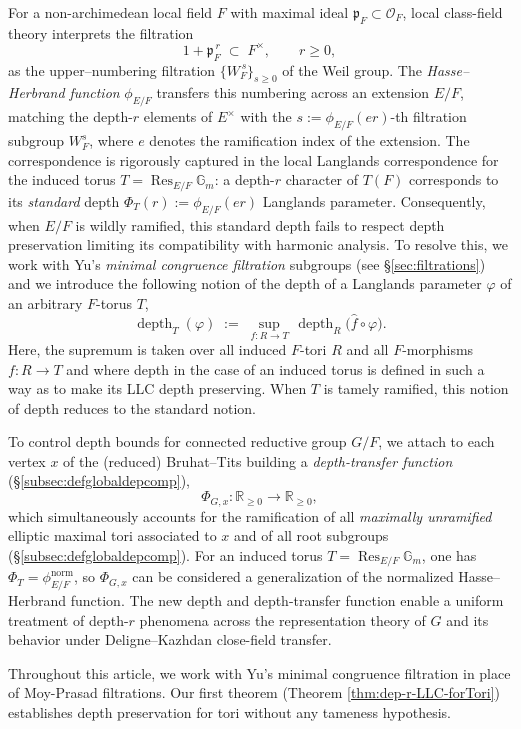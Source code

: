 \documentclass[american]{article}
\numberwithin{equation}{section}
\numberwithin{figure}{section}
\theoremstyle{plain}
\theoremstyle{definition}
\theoremstyle{remark}
\DeclareMathOperator{\depth}{depth}
\DeclareMathOperator{\Res}{Res}
\begin{document}
For a non-archimedean local field $F$  with maximal ideal \(\mathfrak p_F\subset\mathcal O_F\), local class-field theory interprets the filtration
\[
1 + \mathfrak p_F^{\,r}\;\subset\;F^{\times},\qquad r\ge 0,
\]
as the upper--numbering filtration $\{W_F^{\,s}\}_{s\ge 0}$ of the Weil group. The \emph{Hasse--Herbrand function} \(\phi_{E/F}\) transfers this numbering across an extension $E/F$, matching the depth-$r$ elements of $E^{\times}$ with the \(s:=\phi_{E/F}(er)\)-th filtration subgroup \(W_F^s\), where $e$ denotes the ramification index of the extension. The correspondence is rigorously captured in the local Langlands correspondence for the induced torus \(T=\Res_{E/F}\mathbb{G}_m\): a depth-\(r\) character of \(T(F)\) corresponds to its \emph{standard} depth \(\Phi_T(r):=\phi_{E/F}(er)\) Langlands parameter. Consequently, when $E/F$ is wildly ramified, this standard depth  fails to respect depth preservation limiting its compatibility with harmonic analysis. 
To resolve this, we work with Yu's \emph{minimal congruence filtration} subgroups (see \S \ref{sec:filtrations}) and we introduce the following notion of the depth of a Langlands parameter \(\varphi\) of an arbitrary \(F\)-torus \(T\), 
\[
   \depth_T(\varphi)\;:=\;
   \sup_{f:R\to T}\,\depth_R\!\bigl(\widehat f\circ\varphi\bigr).
\]
Here, the supremum is taken over all induced \(F\)-tori \(R\) and all \(F\)-morphisms \(f:R \to T\) and where depth in the case of an induced torus is defined in such a way as to make its LLC depth preserving. When \(T\) is tamely ramified, this notion of depth reduces to the standard notion. 

To control depth bounds  for connected reductive group $G/F$, we attach to
each vertex $x$ of the (reduced) Bruhat--Tits building a \emph{depth-transfer function} (\S \ref{subsec:defglobaldepcomp}),
\[
   \Phi_{G,x}\colon\mathbb{R}_{\ge0}\longrightarrow\mathbb{R}_{\ge0},
\]
which simultaneously accounts for the ramification of all \emph{maximally unramified} elliptic maximal tori associated to $x$ and of all root subgroups (\S \ref{subsec:defglobaldepcomp}). For an induced torus $T=\Res_{E/F}\mathbb{G}_m$, one has $\Phi_T=\phi^{\mathrm{norm}}_{E/F}$, so $\Phi_{G,x}$ can be considered a generalization of the normalized Hasse--Herbrand function. The new depth and depth-transfer function enable a uniform treatment of depth-$r$ phenomena across the representation theory of $G$ and its behavior under Deligne--Kazhdan close-field transfer. 

Throughout this article, we work with Yu's minimal congruence filtration in place of Moy-Prasad filtrations.  Our first theorem (Theorem \ref{thm:dep-r-LLC-forTori}) establishes depth preservation for tori without any tameness hypothesis.
\end{document}
